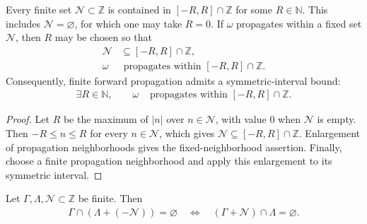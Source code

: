 \begin{lemma}
    \label{lem:qca_finite_propagation_symmetric_interval}
    \leanok
    Every finite set $\mathcal N\subset\mathbb Z$ is contained in
    $[-R,R]\cap\mathbb Z$ for some $R\in\mathbb N$.  This includes
    $\mathcal N=\varnothing$, for which one may take $R=0$.  If $\omega$
    propagates within a fixed set $\mathcal N$, then $R$ may be chosen so that
    \begin{align}
        \mathcal N & \subseteq[-R,R]\cap\mathbb Z,                  \\
        \omega     & \text{ propagates within }[-R,R]\cap\mathbb Z.
    \end{align}
    Consequently, finite forward propagation admits a symmetric-interval
    bound:
    \begin{align}
        \exists R\in\mathbb N,\qquad
        \omega & \text{ propagates within }[-R,R]\cap\mathbb Z.
    \end{align}
\end{lemma}

\begin{proof}\leanok
    Let $R$ be the maximum of $|n|$ over $n\in\mathcal N$, with value $0$
    when $\mathcal N$ is empty.  Then $-R\leq n\leq R$ for every
    $n\in\mathcal N$, which gives
    $\mathcal N\subseteq[-R,R]\cap\mathbb Z$.  Enlargement of propagation
    neighborhoods gives the fixed-neighborhood assertion.  Finally, choose a
    finite propagation neighborhood and apply this enlargement to its symmetric
    interval.
\end{proof}

\begin{lemma}
    \label{lem:qca_disjoint_region_sumset_neg_iff}
    \leanok
    Let $\Gamma,\Lambda,\mathcal N\subset\mathbb Z$ be finite.  Then
    \begin{align}
        \Gamma\cap(\Lambda+(-\mathcal N))=\varnothing
        \quad\Longleftrightarrow\quad
        (\Gamma+\mathcal N)\cap\Lambda=\varnothing.
    \end{align}
\end{lemma}

